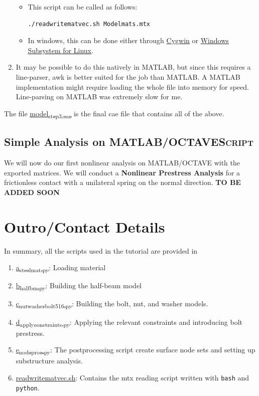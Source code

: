 \documentclass[11pt]{article}
\begin{document}
\begin{enumerate}
\begin{itemize}
\item This script can be called as follows:
\begin{verbatim}
./readwritematvec.sh Modelmats.mtx
\end{verbatim}
\item In windows, this can be done either through \href{https://www.cygwin.com/}{Cygwin} or \href{https://learn.microsoft.com/en-us/windows/wsl/install}{Windows Subsystem for Linux}.
\end{itemize}
\item It may be possible to do this natively in MATLAB, but since this requires a line-parser, awk is better suited for the job than MATLAB.
A MATLAB implementation might require loading the whole file into memory for speed.
Line-parsing on MATLAB was extremely slow for me.
\end{enumerate}
The file \href{https://github.com/Nidish96/Abaqus4Joints/blob/main/assets/assembly/model\_step3.cae}{model\textsubscript{step3.cae}} is the final cae file that contains all of the above.
\subsection{Simple Analysis on MATLAB/OCTAVE\hfill{}\textsc{Script}}
\label{sec:org97462bf}
We will now do our first nonlinear analysis on MATLAB/OCTAVE with the exported matrices.
We will conduct a \textbf{Nonlinear Prestress Analysis} for a frictionless contact with a unilateral spring on the normal direction.
\textbf{TO BE ADDED SOON}

\section{Outro/Contact Details}
\label{sec:org5ca61b4}
In summary, all the scripts used in the tutorial are provided in 
\begin{enumerate}
\item \href{https://github.com/Nidish96/Abaqus4Joints/blob/main/scripts/a\_steelmat.py}{a\textsubscript{steelmat.py}}: Loading material
\item \href{https://github.com/Nidish96/Abaqus4Joints/blob/main/scripts/b\_halfbm.py}{b\textsubscript{halfbm.py}}: Building the half-beam model
\item \href{https://github.com/Nidish96/Abaqus4Joints/blob/main/scripts/c\_nutwasherbolt\_516.py}{c\textsubscript{nutwasherbolt}\textsubscript{516.py}}: Building the bolt, nut, and washer models.
\item \href{https://github.com/Nidish96/Abaqus4Joints/blob/main/scripts/d\_applyconstraints.py}{d\textsubscript{applyconstraints.py}}: Applying the relevant constraints and introducing bolt prestress.
\item \href{https://github.com/Nidish96/Abaqus4Joints/blob/main/scripts/e\_nodeproc.py}{e\textsubscript{nodeproc.py}}: The postprocessing script create surface node sets and setting up substructure analysis.
\item \href{https://github.com/Nidish96/Abaqus4Joints/blob/main/scripts/readwritematvec.sh}{readwritematvec.sh}: Contains the mtx reading script written with \texttt{bash} and \texttt{python}.
\end{enumerate}
\end{document}
